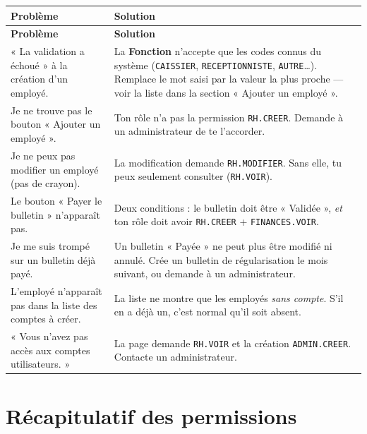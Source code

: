 \documentclass[12pt,a4paper]{article}
\begin{document}
\begin{longtable}{p{6.5cm}p{8.5cm}}
  \toprule
  \textbf{Problème} & \textbf{Solution} \\
  \midrule
  \endfirsthead
  \toprule
  \textbf{Problème} & \textbf{Solution} \\
  \midrule
  \endhead

  « La validation a échoué » à la création d'un employé. &
  La \textbf{Fonction} n'accepte que les codes connus du système (\texttt{CAISSIER}, \texttt{RECEPTIONNISTE}, \texttt{AUTRE}\ldots). Remplace le mot saisi par la valeur la plus proche — voir la liste dans la section « Ajouter un employé ». \\

  Je ne trouve pas le bouton « Ajouter un employé ». &
  Ton rôle n'a pas la permission \texttt{RH.CREER}. Demande à un administrateur de te l'accorder. \\

  Je ne peux pas modifier un employé (pas de crayon). &
  La modification demande \texttt{RH.MODIFIER}. Sans elle, tu peux seulement consulter (\texttt{RH.VOIR}). \\

  Le bouton « Payer le bulletin » n'apparaît pas. &
  Deux conditions : le bulletin doit être « Validée », \emph{et} ton rôle doit avoir \texttt{RH.CREER} + \texttt{FINANCES.VOIR}. \\

  Je me suis trompé sur un bulletin déjà payé. &
  Un bulletin « Payée » ne peut plus être modifié ni annulé. Crée un bulletin de régularisation le mois suivant, ou demande à un administrateur. \\

  L'employé n'apparaît pas dans la liste des comptes à créer. &
  La liste ne montre que les employés \emph{sans compte}. S'il en a déjà un, c'est normal qu'il soit absent. \\

  « Vous n'avez pas accès aux comptes utilisateurs. » &
  La page demande \texttt{RH.VOIR} et la création \texttt{ADMIN.CREER}. Contacte un administrateur. \\

  \bottomrule
\end{longtable}

\newpage

\section{Récapitulatif des permissions}\label{sec:permissions}
\end{document}

